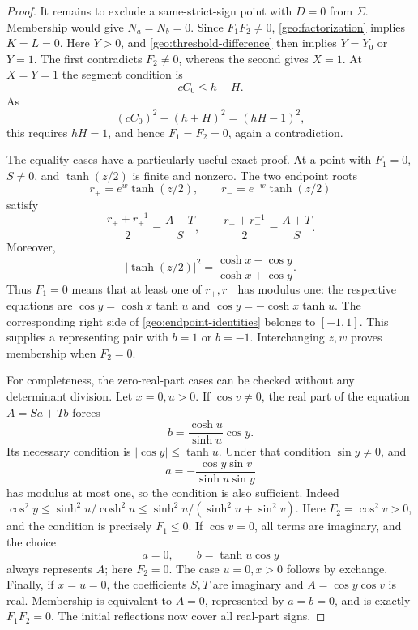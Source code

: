 \documentclass[11pt]{article}
\numberwithin{equation}{section}
\theoremstyle{definition}
\begin{document}
\begin{proof}
It remains to exclude a same-strict-sign point with \(D=0\)
from \(\Sigma\).  Membership would give \(N_a=N_b=0\).
Since \(F_1F_2\ne0\), \eqref{geo:factorization} implies
\(K=L=0\).  Here \(Y>0\), and \eqref{geo:threshold-difference}
then implies \(Y=Y_0\) or \(Y=1\).  The first contradicts
\(F_2\ne0\), whereas the second gives \(X=1\).  At \(X=Y=1\)
the segment condition is
\[
                         cC_0\leq h+H.
\]
As
\[
                 (cC_0)^2-(h+H)^2=(hH-1)^2,
\]
this requires \(hH=1\), and hence \(F_1=F_2=0\), again a
contradiction.

The equality cases have a particularly useful exact proof.
At a point with \(F_1=0\), \(S\ne0\), and
\(\tanh(z/2)\) is finite and nonzero.  The two endpoint roots
\begin{equation}\label{geo:endpoint-roots}
 r_+=e^w\tanh(z/2),\qquad r_-=e^{-w}\tanh(z/2)
\end{equation}
satisfy
\begin{equation}\label{geo:endpoint-identities}
 \frac{r_++r_+^{-1}}2=\frac{A-T}{S},\qquad
 \frac{r_-+r_-^{-1}}2=\frac{A+T}{S}.
\end{equation}
Moreover,
\begin{equation}\label{geo:tanh-modulus}
 |\tanh(z/2)|^2=\frac{\cosh x-\cos y}{\cosh x+\cos y}.
\end{equation}
Thus \(F_1=0\) means that at least one of \(r_+,r_-\) has
modulus one: the respective equations are
\(\cos y=\cosh x\tanh u\) and
\(\cos y=-\cosh x\tanh u\).  The corresponding right side
of \eqref{geo:endpoint-identities} belongs to \([-1,1]\).
This supplies a representing pair with \(b=1\) or \(b=-1\).
Interchanging \(z,w\) proves membership when \(F_2=0\).

For completeness, the zero-real-part cases can be checked without
any determinant division.  Let \(x=0,u>0\).  If \(\cos v\ne0\),
the real part of the equation \(A=Sa+Tb\) forces
\[
 b=\frac{\cosh u}{\sinh u}\cos y.
\]
Its necessary condition is \(|\cos y|\leq\tanh u\).
Under that condition \(\sin y\ne0\), and
\[
 a=-\frac{\cos y\sin v}{\sinh u\sin y}
\]
has modulus at most one, so the condition is also sufficient.
Indeed
\(\cos^2y\leq\sinh^2u/\cosh^2u
\leq\sinh^2u/(\sinh^2u+\sin^2v)\).
Here \(F_2=\cos^2v>0\), and the condition is precisely \(F_1\leq0\).
If \(\cos v=0\), all terms are imaginary, and the choice
\[
                 a=0,\qquad b=\tanh u\cos y
\]
always represents \(A\); here \(F_2=0\).
The case \(u=0,x>0\) follows by exchange.  Finally, if \(x=u=0\),
the coefficients \(S,T\) are imaginary and \(A=\cos y\cos v\)
is real.  Membership is equivalent to \(A=0\), represented by
\(a=b=0\), and is exactly \(F_1F_2=0\).
The initial reflections now cover all real-part signs.
\end{proof}
\end{document}

